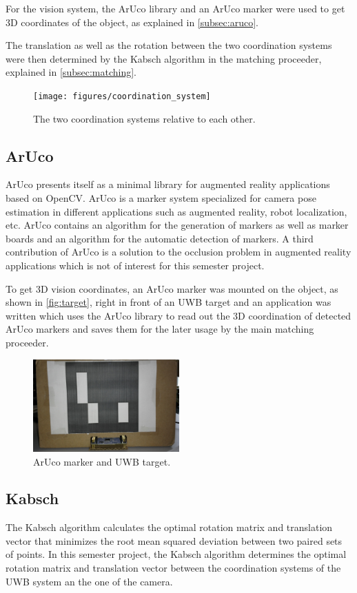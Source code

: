 For the vision system, the ArUco \cite{Aruco2014} library and an ArUco marker were used to get 3D coordinates of the object, as explained in \autoref{subsec:aruco}.

The translation as well as the rotation between the two coordination systems were then determined by the Kabsch algorithm \cite{Kabsch:a12999} in the matching proceeder, explained in \autoref{subsec:matching}.
\begin{figure}[h]\centering
	\texttt{[image: figures/coordination\_system]}
	\caption{The two coordination systems relative to each other.}\label{fig:coordinationsystem}
\end{figure}

\subsection{ArUco}\label{subsec:aruco}
ArUco \cite{Aruco2014} presents itself as a minimal library for augmented reality applications based on OpenCV. ArUco is a marker system specialized for camera pose estimation in different applications such as augmented reality, robot localization, etc. ArUco contains an algorithm for the generation of markers as well as marker boards and an algorithm for the automatic detection of markers. A third contribution of ArUco is a solution to the occlusion problem in augmented reality applications which is not of interest for this semester project.

To get 3D vision coordinates, an ArUco marker was mounted on the object, as shown in \autoref{fig:target}, right in front of an UWB target and an application was written which uses the ArUco library to read out the 3D coordination of detected ArUco markers and saves them for the later usage by the main matching proceeder.
\begin{figure}[h]\centering
	\includegraphics[width=0.5\textwidth]{figures/Box_cut.jpg}
	\caption{ArUco marker and UWB target.}\label{fig:target}
\end{figure}

\subsection{Kabsch}
The Kabsch algorithm \cite{Kabsch:a12999} calculates the optimal rotation matrix and translation vector that minimizes the root mean squared deviation between two paired sets of points. In this semester project, the Kabsch algorithm determines the optimal rotation matrix and translation vector between the coordination systems of the UWB system an the one of the camera.

